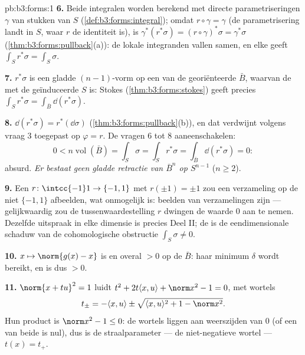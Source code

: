 \begin{solution}{pb:b3:forms:1}
\textbf{6.} Beide integralen worden berekend met directe
parametriseringen $\gamma$ van stukken van $S$
(\cref{def:b3:forms:integral}); omdat $r\circ\gamma = \gamma$ (de
parametrisering landt in $S$, waar $r$ de identiteit is), is
$\gamma^*(r^*\sigma) = (r\circ\gamma)^*\sigma = \gamma^*\sigma$
(\cref{thm:b3:forms:pullback}(a)): de lokale integranden vallen
samen, en elke  geeft $\int_Sr^*\sigma =
\int_S\sigma$.

\textbf{7.} $r^*\sigma$ is een gladde $(n-1)$-vorm op een
 van de  georiënteerde $\bar B$, waarvan de 
met de geïnduceerde  $S$ is: Stokes
(\cref{thm:b3:forms:stokes}) geeft precies $\int_Sr^*\sigma =
\int_{\bar B}\dd(r^*\sigma)$.

\textbf{8.} $\dd(r^*\sigma) = r^*(\dd\sigma)$
(\cref{thm:b3:forms:pullback}(b)), en dat verdwijnt volgens vraag
3 toegepast op $\varphi = r$. De vragen 6 tot 8 aaneenschakelen:
\[
0 < n\operatorname{vol}(\bar B) = \int_S\sigma =
\int_Sr^*\sigma = \int_{\bar B}\dd(r^*\sigma) = 0 :
\]
absurd. \emph{Er bestaat geen gladde retractie van $\bar B^n$ op
$S^{n-1}$} ($n \geq 2$).

\textbf{9.} Een  $r\colon\intcc{-1}1\to\{-1,1\}$ met
$r(\pm1) = \pm1$ zou een  verzameling op de niet
 $\{-1, 1\}$ afbeelden, wat onmogelijk is: 
beelden van  verzamelingen zijn  ---
gelijkwaardig zou de tussenwaardestelling $r$ dwingen de waarde
$0$ aan te nemen. Dezelfde uitspraak in elke dimensie is precies
Deel II; de  is de eendimensionale schaduw van de
cohomologische obstructie $\int_S\sigma \neq 0$.

\textbf{10.} $x \mapsto \norm{g(x) - x}$ is  en overal $>
0$ op de  $\bar B$: haar minimum $\delta$ wordt bereikt,
en is dus $> 0$.

\textbf{11.} $\norm{x + tu}^2 = 1$ luidt $t^2 + 2t\langle x,
u\rangle + \norm x^2 - 1 = 0$, met wortels
\[
t_\pm = -\langle x, u\rangle \pm \sqrt{\langle x,
u\rangle^2 + 1 - \norm x^2} .
\]
Hun product is $\norm x^2 - 1 \leq 0$: de wortels liggen aan
weerszijden van $0$ (of een van beide is nul), dus is de
straalparameter --- de niet-negatieve wortel --- $t(x) = t_+$.


\end{solution}
